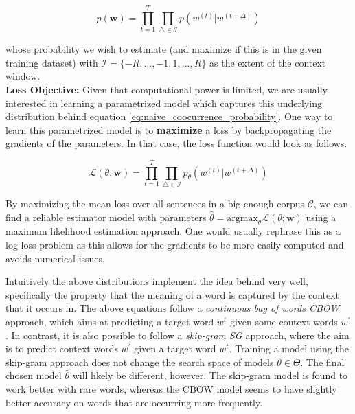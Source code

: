 \documentclass[a4paper,12pt,oneside,openright]{report}
\begin{document}
\begin{equation}
p(\mathbf{w})=\prod_{t=1}^{T} \prod_{\triangle \in \mathcal{I} } p\left( w^{(t)} | w^{(t +\Delta)}\right)
\label{eq:naive_coocurrence_probability}
\end{equation}

whose probability we wish to estimate (and maximize if this is in the given training dataset) with $\mathcal{I}=\{-R, \ldots,-1,1, \ldots, R\}$ as the extent of the context window. \\

\textbf{Loss Objective:} Given that computational power is limited, we are usually interested in learning a parametrized model which captures this underlying distribution behind equation \eqref{eq:naive_coocurrence_probability}.
One way to learn this parametrized model is to \textbf{maximize} a loss by backpropagating the gradients of the parameters.
In that case, the loss function would look as follows.


\begin{equation}
\mathcal{L}(\theta ; \mathbf{w})= \prod_{t=1}^{T} \prod_{\triangle \in \mathcal{I}} p_{\theta}\left(w^{(t)} | w^{(t +\Delta)}\right)
\end{equation}{\label{eq:basic_equation_log_maximization}}

By maximizing the mean loss over all sentences in a big-enough corpus $\mathcal{C}$, we can find a reliable estimator model with parameters $\hat{\theta} = \text{argmax}_\theta \mathcal{L}(\theta ; \mathbf{w})$ using a maximum likelihood estimation approach.
One would usually rephrase this as a log-loss problem as this allows for the gradients to be more easily computed and avoids numerical issues.

Intuitively the above distributions implement the idea  behind \cite{harris54} very well, specifically the property that the meaning of a word is captured by the context that it occurs in.
The above equations follow a \textit{continuous bag of words CBOW} approach, which aims at predicting a target word $w^t$ given some context words $w^{\prime}$.
In contrast, it is also possible to follow a \textit{skip-gram SG} approach, where the aim is to predict context words $w^{\prime}$ given a target word $w^t$.
Training a model using the skip-gram approach does not change the search space of models $\theta \in \Theta$.
The final chosen model $\hat{\theta}$ will likely be different, however.
The skip-gram model is found to work better with rare words, whereas the CBOW model seems to have slightly better accuracy on words that are occurring more frequently.
\end{document}
